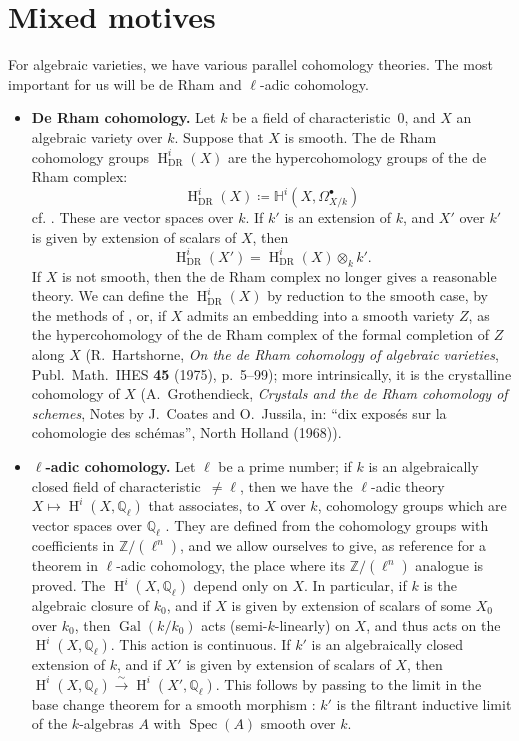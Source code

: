 \documentclass{article}
\theoremstyle{definition}
\newenvironment{env}[1]
  {\renewcommand\theinnerenv{(#1)}\innerenv}
  {\endinnerenv}
\newcommand{\bb}{\mathbb}
\newcommand{\ZZ}{\bb{Z}}
\newcommand{\QQ}{\bb{Q}}
\newcommand{\DR}{{\mathrm{DR}}}
\DeclareMathOperator{\Gal}{Gal}
\DeclareMathOperator{\Spec}{Spec}
\DeclareMathOperator{\HH}{H}
\newcommand{\oldpage}[1]{\marginpar{\footnotesize$\Big\vert$ \textit{p.~#1}}}
\begin{document}
\section{Mixed motives}
\label{1}
\oldpage{11~(89)}

\begin{env}{1.1}
  For algebraic varieties, we have various parallel cohomology theories.
  The most important for us will be de Rham and $\ell$-adic cohomology.

  \begin{itemize}
    \item \textbf{De Rham cohomology.}
      Let $k$ be a field of characteristic~$0$, and $X$ an algebraic variety over $k$.
      Suppose that $X$ is smooth.
      The de Rham cohomology groups $\HH_\DR^i(X)$ are the hypercohomology groups of the de Rham complex:
      \[
        \HH_\DR^i(X)
        \coloneqq \mathbb{H}^i(X,\Omega_{X/k}^\bullet)
      \]
      cf. \cite{G}.
      These are vector spaces over $k$.
      If $k'$ is an extension of $k$, and $X'$ over $k'$ is given by extension of scalars of $X$, then
      \[
        \HH_\DR^i(X') = \HH_\DR^i(X)\otimes_k k'.
      \]
      If $X$ is not smooth, then the de Rham complex no longer gives a reasonable theory.
      We can define the $\HH_\DR^i(X)$ by reduction to the smooth case, by the methods of \cite{D3}, or, if $X$ admits an embedding into a smooth variety $Z$, as the hypercohomology of the de Rham complex of the formal completion of $Z$ along $X$ (R.~Hartshorne, \emph{On the de Rham cohomology of algebraic varieties}, Publ.~Math.~IHES \textbf{45} (1975), p.~5--99);
      more intrinsically, it is the crystalline cohomology of $X$ (A.~Grothendieck, \emph{Crystals and the de Rham cohomology of schemes}, Notes by J.~Coates and O.~Jussila, in: ``dix expos\'{e}s sur la cohomologie des sch\'{e}mas'', North Holland (1968)).
    \item \textbf{$\ell$-adic cohomology.}
      Let $\ell$ be a prime number;
      if $k$ is an algebraically closed field of characteristic~$\neq\ell$, then we have the $\ell$-adic theory $X\mapsto\HH^i(X,\QQ_\ell)$ that associates, to $X$ over $k$, cohomology groups which are vector spaces over $\QQ_\ell$ \cite[\S VI]{SGA5}.
      They are defined from the cohomology groups with coefficients in $\ZZ/(\ell^n)$, and we allow ourselves to give, as reference for a theorem in $\ell$-adic cohomology, the place where its $\ZZ/(\ell^n)$ analogue is proved.
      The $\HH^i(X,\QQ_\ell)$ depend only on $X$.
      In particular, if $k$ is the algebraic closure of $k_0$, and if $X$ is given by extension of scalars of some $X_0$ over $k_0$, then $\Gal(k/k_0)$ acts (semi-$k$-linearly) on $X$, and thus acts on the $\HH^i(X,\QQ_\ell)$.
      This action is continuous.
      If $k'$ is an algebraically closed extension of $k$, and if $X'$ is given by extension of scalars of $X$, then $\HH^i(X,\QQ_\ell)\xrightarrow{\sim}\HH^i(X',\QQ_\ell)$.
      \oldpage{12~(90)}
      This follows by passing to the limit in the base change theorem for a smooth morphism \cite[\S XVI, 1.2]{SGA4}: $k'$ is the filtrant inductive limit of the $k$-algebras $A$ with $\Spec(A)$ smooth over $k$.
  \end{itemize}


\end{env}
\end{document}
